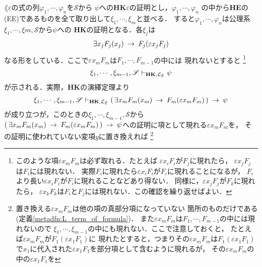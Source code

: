 	\begin{sketch}
		$\lang{\varepsilon}$の式の列$\varphi_{1},\cdots,\varphi_{n}$を$\mathscr{S}$から
		$\psi$への{\bf HK}$\varepsilon$の証明とし，$\varphi_{1},\cdots,\varphi_{n}$
		の中から{\bf HE}の(EE)であるものを全て取り出して$\xi_{1},\cdots,\xi_{m}$と並べる．
		すると$\varphi_{1},\cdots,\varphi_{n}$は公理系
		$\xi_{1},\cdots,\xi{m},\mathscr{S}$から$\psi$への
		{\bf HK}の証明となる．各$\xi_{j}$は
		\begin{align}
			\exists x_{j} F_{j}(x_{j}) \hspace{0.25em}\rightarrow\hspace{0.25em} F_{j}(\varepsilon x_{j} F_{j})
		\end{align}
		なる形をしている．ここで$\varepsilon x_{m} F_{m}$は$F_{1},\cdots,F_{m-1}$の中には
		現れないとすると
		\footnote{
			このような項$\varepsilon x_{m} F_{m}$は必ず取れる．たとえば
			$\varepsilon x_{i} F_{i}$が$F_{j}$に現れたら，
			$\varepsilon x_{j} F_{j}$は$F_{i}$には現れない．
			実際$F_{i}$に現れたら$\varepsilon x_{i} F_{i}$が$F_{i}$に現れることになるが，
			$F_{i}$より長い$\varepsilon x_{i} F_{i}$が$F_{i}$に現れることなどあり得ない．
			同様に，$\varepsilon x_{j} F_{j}$が$F_{k}$に現れたら，
			$\varepsilon x_{k} F_{k}$は$F_{i}$と$F_{j}$には現れない．この確認を繰り返せばよい．
		}
		\begin{align}
			\xi_{1},\cdots,\xi_{m-1},\mathscr{S} 
			\provable{\mbox{{\bf HK}},\lang{\varepsilon}} \psi
		\end{align}
		が示される．実際，{\bf HK}の演繹定理より
		\begin{align}
			\xi_{1},\cdots,\xi_{m-1},\mathscr{S} 
			\provable{\mbox{{\bf HK}},\lang{\varepsilon}} 
			(\, \exists x_{m} F_{m}(x_{m}) \rarrow F_{m}(\varepsilon x_{m} F_{m})\, ) \rarrow \psi
		\end{align}
		が成り立つが，このときの$\xi_{1},\cdots,\xi_{m-1},\mathscr{S}$から
		$(\, \exists x_{m} F_{m}(x_{m}) \hspace{0.25em}\rightarrow\hspace{0.25em} F_{m}(\varepsilon x_{m} F_{m})\, ) 
		\hspace{0.25em}\rightarrow\hspace{0.25em} \psi$への証明に項として現れる$\varepsilon x_{m} F_{m}$を，
		その証明に使われていない変項$y$に置き換えれば
		\footnote{
			置き換える$\varepsilon x_{m} F_{m}$は他の項の真部分項になっていない
			箇所のものだけである(定義\ref{metadfn:L_term_of_formula})．
			また$\varepsilon x_{m} F_{m}$は$F_{1},\cdots,F_{m-1}$の中には現れないので
			$\xi_{1},\cdots,\xi_{m-1}$の中にも現れない．ここで注意しておくと，
			たとえば$\varepsilon x_{m} F_{m}$が$F_{1}(\varepsilon x_{1} F_{1})$に
			現れたとすると，つまりその$\varepsilon x_{m} F_{m}$は$F_{1}(\varepsilon x_{1} F_{1})$
			で$x_{1}$に代入された$\varepsilon x_{1} F_{1}$を部分項として含むように現れるが，
			その$\varepsilon x_{m} F_{m}$の中の$\varepsilon x_{1} F_{1}$を
}
\end{sketch}
